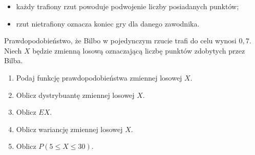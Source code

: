 \documentclass[twoside]{mwart}
\begin{document}
\begin{enumerate}
\begin{itemize}
\item każdy trafiony rzut powoduje podwojenie liczby posiadanych punktów;
\item rzut nietrafiony oznacza koniec gry dla danego zawodnika.
\end{itemize}
Prawdopodobieństwo, że Bilbo w pojedynczym rzucie trafi do celu wynosi $0{,}7$. Niech $X$ będzie zmienną losową oznaczającą liczbę punktów zdobytych przez
Bilba.
\begin{enumerate}
\item Podaj funkcję prawdopodobieństwa zmiennej losowej $X$.
\item Oblicz dystrybuantę zmiennej losowej $X$.
\item Oblicz $EX$.
\item Oblicz wariancję zmiennej losowej $X$.
\item Oblicz $P(5\leq X\leq 30)$.
\end{enumerate}



\end{enumerate}
\end{document}

